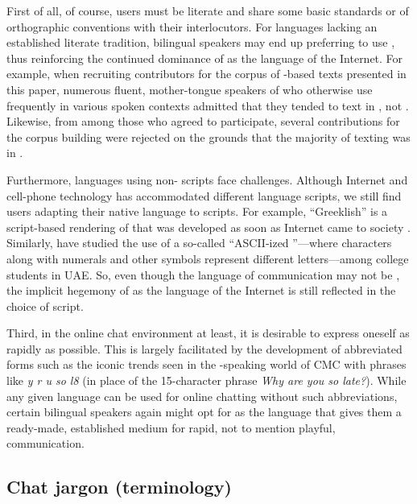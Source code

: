 \documentclass[output=paper
,newtxmath
,modfonts
,nonflat]{langsci/langscibook}
\begin{document}
First of all, of course, users must be literate and share some basic standards or  of orthographic conventions with their interlocutors. For languages lacking an established literate tradition, bilingual speakers may end up preferring to use , thus reinforcing the continued dominance of  as the language of the Internet. For example, when recruiting contributors for the corpus of -based texts presented in this paper, numerous fluent, mother-tongue speakers of  who otherwise use  frequently in various spoken contexts admitted that they tended to text in , not . Likewise, from among those who agreed to participate, several contributions for the corpus building were rejected on the grounds that the majority of texting was in . 

Furthermore, languages using non- scripts face challenges. Although Internet and cell-phone technology has accommodated different language scripts, we still find users adapting their native language to  scripts. For example, “Greeklish” is a  script-based rendering of  that was developed as soon as Internet came to  society \citep{androutsopoulos2012}. Similarly, \citet{palfreyman2007} have studied the use of a so-called “ASCII-ized ”—where  characters along with numerals and other symbols represent different  letters—among college students in UAE. So, even though the language of communication may not be , the implicit hegemony of  as the language of the Internet is still reflected in the choice of script. 

Third, in the online chat environment at least, it is desirable to express oneself as rapidly as possible. This is largely facilitated by the development of abbreviated forms such as the iconic trends seen in the -speaking world of CMC with phrases like \textit{y r u so l8} (in place of the 15-character phrase \textit{Why are you so late?}). While any given language can be used for online chatting without such abbreviations, certain bilingual speakers again might opt for  as the language that gives them a ready-made, established medium for rapid, not to mention playful, communication. 

\subsection{Chat jargon (terminology)}
\end{document}
